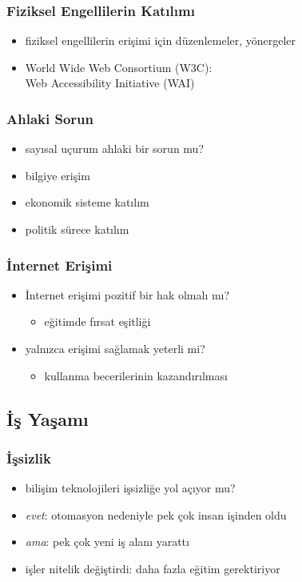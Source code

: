 \documentclass[dvipsnames]{beamer}
\theoremstyle{definition}
\theoremstyle{example}
\theoremstyle{plain}
\begin{document}
\begin{frame}
  \frametitle{Fiziksel Engellilerin Katılımı}

  \begin{itemize}
    \item fiziksel engellilerin erişimi için düzenlemeler, yönergeler
    \item World Wide Web Consortium (W3C):\\
      Web Accessibility Initiative (WAI)
  \end{itemize}
\end{frame}

\begin{frame}
  \frametitle{Ahlaki Sorun}

  \begin{itemize}
    \item sayısal uçurum ahlaki bir sorun mu?

    \medskip
    \item bilgiye erişim
    \item ekonomik sisteme katılım
    \item politik sürece katılım
  \end{itemize}
\end{frame}

\begin{frame}
  \frametitle{İnternet Erişimi}

  \begin{itemize}
    \item İnternet erişimi pozitif bir hak olmalı mı?
    \begin{itemize}
      \item eğitimde fırsat eşitliği
    \end{itemize}

    \pause
    \medskip
    \item yalnızca erişimi sağlamak yeterli mi?
    \begin{itemize}
      \item kullanma becerilerinin kazandırılması
    \end{itemize}
  \end{itemize}
\end{frame}

\subsection{İş Yaşamı}

\begin{frame}
  \frametitle{İşsizlik}

  \begin{itemize}
    \item bilişim teknolojileri işsizliğe yol açıyor mu?

    \bigskip
    \item \emph{evet}: otomasyon nedeniyle pek çok insan işinden oldu
    \item \emph{ama}: pek çok yeni iş alanı yarattı
    \item işler nitelik değiştirdi: daha fazla eğitim gerektiriyor
  \end{itemize}
\end{frame}
\end{document}
